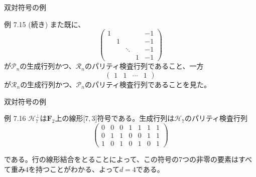 \documentclass[dvipdfmx,10pt,jsarticle]{beamer}
\begin{document}
  \begin{frame}{双対符号の例}
    \begin{block}{例 7.15 (続き)}
      また既に、
      \[\begin{pmatrix}
          1 &   &   &  & -1 \\
            & 1 &   &  & -1 \\
            &   & \ddots &  & -1 \\
            &   &   & 1 & -1
      \end{pmatrix} \]
      が$\mathcal{P}_n$の生成行列かつ、$\mathcal{R}_n$のパリティ検査行列であること、一方
      \[\begin{pmatrix}
          1 & 1 & \cdots & 1
      \end{pmatrix} \]
      が$\mathcal{R}_n$の生成行列かつ、$\mathcal{P}_n$のパリティ検査行列であることを見た。
    \end{block}
  \end{frame}
  \begin{frame}{双対符号の例}
    \begin{block}{例 7.16}
      $\mathcal{H}_7^\perp$は$\mathbf{F}_2$上の線形$\lbrack7,3\rbrack$符号である。生成行列は$\mathcal{H}_7$のパリティ検査行列
      \[\begin{pmatrix}
          0 & 0 & 0 & 1 & 1 & 1 & 1 \\
          0 & 1 & 1 & 0 & 0 & 1 & 1 \\
          1 & 0 & 1 & 0 & 1 & 0 & 1 
        \end{pmatrix} \]
    \end{block}
    である。行の線形結合をとることによって、この符号の7つの非零の要素はすべて重み$4$を持つことがわかる、よって$d=4$である。
  \end{frame}
\end{document}
